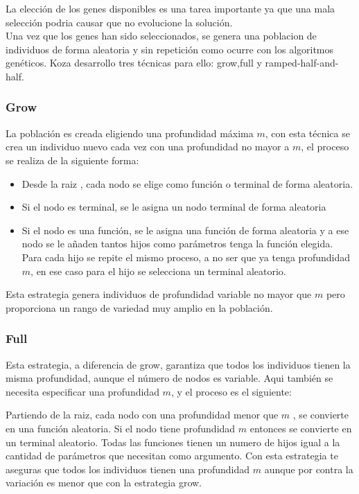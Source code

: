 \documentclass[12pt]{article} \usepackage[utf8x]{inputenc}
\begin{document}
La elección de los genes disponibles es una tarea importante ya que una mala selección podria causar que no evolucione la solución.\\

Una vez que los genes han sido seleccionados, se genera una poblacion de individuos de forma aleatoria y sin repetición como ocurre con los algoritmos genéticos. Koza desarrollo tres técnicas para ello: grow,full y ramped-half-and-half.

\subsubsection{Grow}

La población es creada eligiendo una profundidad máxima \(m\), con esta técnica se crea un individuo nuevo cada vez con una profundidad no mayor a \(m\), el proceso se realiza de la siguiente forma:
\begin{itemize}
\item  Desde la raiz , cada nodo se elige como función o terminal de forma aleatoria.
\item  Si el nodo es terminal, se le asigna un nodo terminal de forma aleatoria
\item  Si el nodo es una función, se le asigna una función de forma aleatoria y a ese nodo se le añaden tantos hijos como parámetros tenga la función elegida. Para cada hijo se repite el mismo proceso, a no ser que ya tenga profundidad \(m\), en ese caso para el hijo se selecciona un terminal aleatorio.
\end{itemize}

Esta estrategia genera individuos de profundidad variable no mayor que \(m\) pero proporciona un rango de variedad muy amplio en la población.

\subsubsection{Full}

Esta estrategia, a diferencia de grow, garantiza que todos los individuos tienen la misma profundidad, aunque el número de nodos es variable. Aqui también se necesita especificar una profundidad \(m\), y el proceso es el siguiente:

 Partiendo de la raiz, cada nodo con una profundidad menor que \(m\) , se convierte en una función aleatoria. Si el nodo tiene profundidad \(m\) entonces se convierte en un terminal aleatorio. 
 Todas las funciones tienen un numero de hijos igual a la cantidad de parámetros que necesitan como argumento. Con esta estrategia te aseguras que todos los individuos tienen una profundidad \(m\) aunque por contra la variación es menor que con la estrategia grow.\\
 
\end{document}
